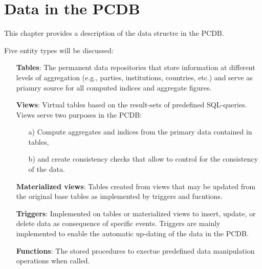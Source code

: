 \chapter{Data in the PCDB}\label{chap_data_in_the_PCDB}

This chapter provides a description of the data structre in the PCDB. 

Five entity types will be discussed:
\begin{itemize}
\item[]{{\bf Tables}: 
  The permanent data repositories that store information at different levels of aggregation (e.g., parties, institutions, countries, etc.) and serve as priamry source for all computed indices and aggregate figures.}
\item[]{{\bf Views}: 
  Virtual tables based on the result-sets of predefined SQL-queries.
  Views serve two purposes in the PCDB:
  \begin{itemize}
    \item[a)]Compute aggregates and indices from the primary data contained in tables,
    \item[b)]and create consistency checks that allow to control for the consistency of the data.
  \end{itemize}}
\item[]{{\bf Materialized views}: Tables created from views that may be updated from the original base tables as implemented by triggers and fucntions.}
\item[]{{\bf Triggers}: 
  Implemented on tables or materialized views to insert, update, or delete data as consequence of specific events. 
  Triggers are mainly implemented to enable the automatic up-dating of the data in the PCDB.}
\item[]{{\bf Functions}: The stored procedures to exectue predefined data manipulation operations when called.} 
\end{itemize}
 